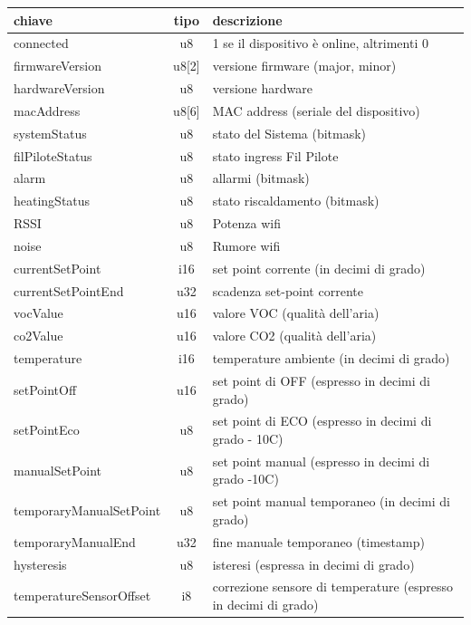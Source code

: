 \documentclass[12pt,a4paper,twoside,titlepage]{book}
\begin{document}
\begin{center}
\begin{longtable}{| p{5cm} | c | p{8cm} |}
    \hline
    \textbf{chiave} & \textbf{tipo} & \textbf{descrizione} \\ \hline
    connected & u8 & 1 se il dispositivo è online, altrimenti 0 \\ \hline
    firmwareVersion & u8[2] & versione \gls{firmware} (major, minor) \\ \hline
    hardwareVersion & u8 & versione hardware \\ \hline
    macAddress & u8[6] & MAC address (seriale del dispositivo) \\ \hline
    systemStatus & u8 & stato del Sistema (bitmask) \\ \hline
    filPiloteStatus & u8 & stato ingress Fil Pilote \\ \hline
    alarm & u8 & allarmi (bitmask)\\ \hline
    heatingStatus & u8 & stato riscaldamento (bitmask)\\ \hline
    RSSI & u8 &Potenza \Gls{wifi}\\ \hline
    noise & u8 &Rumore \Gls{wifi}\\ \hline
    currentSetPoint & i16 & set point corrente (in decimi di grado)\\ \hline
    currentSetPointEnd & u32 & scadenza set-point corrente\\ \hline
    vocValue & u16 & valore VOC (qualità dell’aria)\\ \hline
    co2Value & u16 & valore CO2 (qualità dell’aria)\\ \hline
    temperature & i16 & temperature ambiente (in decimi di grado)\\ \hline
    setPointOff & u16 & set point di OFF (espresso in decimi di grado)\\ \hline
    setPointEco & u8 & set point di ECO (espresso in decimi di grado - 10C)\\ \hline
    manualSetPoint & u8 & set point manual (espresso in decimi di grado -10C)\\ \hline
    temporaryManualSetPoint & u8 & set point manual temporaneo (in decimi di grado)\\ \hline
    temporaryManualEnd & u32 & fine manuale temporaneo (timestamp)\\ \hline
    hysteresis & u8 & isteresi (espressa in decimi di grado)\\ \hline
    temperatureSensorOffset & i8 & correzione sensore di temperature (espresso in decimi di grado)\\ \hline

\end{longtable}
\end{center}
\end{document}
